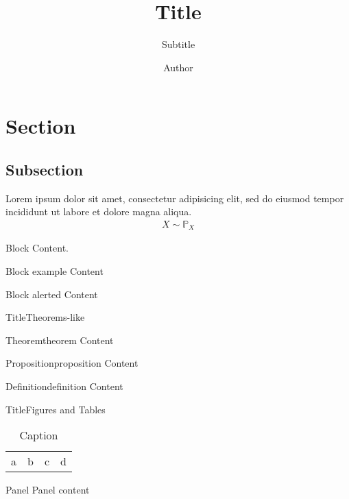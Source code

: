 \documentclass[8pt, aspectratio=169, t, notheorems]{beamer}
\title{Title}
\subtitle{Subtitle}
\author{Author}
\institute{Institute}
\begin{document}
\maketitle
\section{Section} %
\label{sec:section}
\subsection{Subsection} %
\label{sub:subsection}

\begin{frame}{\insertsection}{\insertsubsection}
	Lorem ipsum dolor sit amet, consectetur adipisicing elit, sed do eiusmod
	tempor incididunt ut labore et dolore magna aliqua. 
	\begin{align}
		X \sim \mathbb{P}_{X}
	\end{align}

	\begin{block}{Block}
		Content.
	\end{block}

	\begin{exampleblock}{Block example}	
		Content
	\end{exampleblock}

	\begin{alertblock}{Block alerted}
		Content
	\end{alertblock}
\end{frame}

\begin{frame}{Title}{Theorems-like}
	\begin{theorem}{Theorem}{theorem}
		Content
	\end{theorem}

	\begin{proposition}{Proposition}{proposition}
		Content
	\end{proposition}

	\begin{definition}{Definition}{definition}
		Content
	\end{definition}
\end{frame}

\begin{frame}{Title}{Figures and Tables}
	\begin{table}[tb]
		\caption{Caption}
		\label{tab:tablename}
		\centering
		\begin{tabular}{l|ccc}
		a & b & c & d
		\end{tabular}
	\end{table}

	\begin{panel}{Panel}
		Panel content
	\end{panel}
\end{frame}
\end{document}
